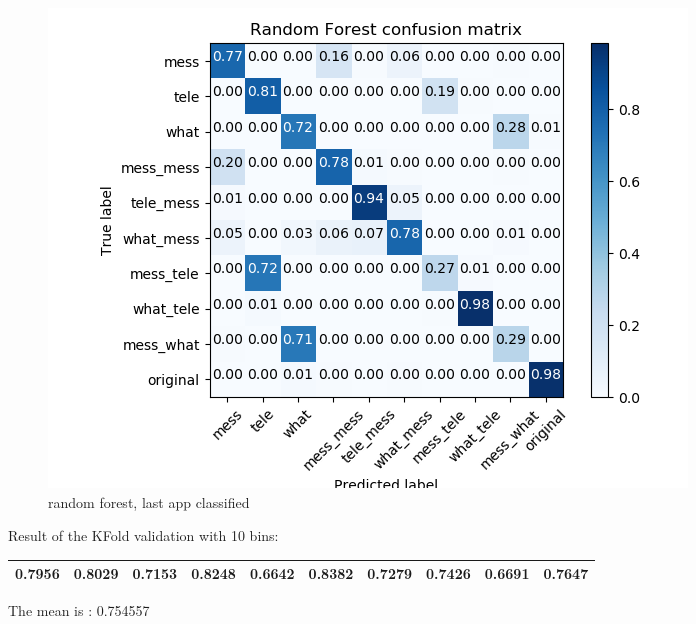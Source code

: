  \begin{figure}[H] 
\centering 
\includegraphics[scale=.6]{images/rf_initial_single_double_complete.png} 
\caption{random forest, last app classified} 
\end{figure} 


Result of the KFold validation with 10 bins:
 {\def\arraystretch{1.3} 
 \begin{table}[H] 
\centering 
\begin{tabular}{|l |l |l |l |l |l |l |l |l |l |}  
\hline 
0.7956&
0.8029&
0.7153&
0.8248&
0.6642&
0.8382&
0.7279&
0.7426&
0.6691&
0.7647\\ \hline  

\end{tabular} 
\end{table} }

The mean is : 0.754557